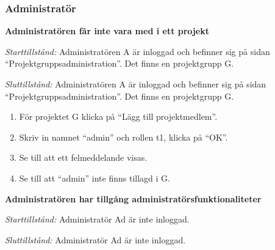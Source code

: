 \documentclass[a4paper]{article}
\begin{document}
\subsubsection{Administratör}
\begin{FT}
\item \textbf{Administratören får inte vara med i ett projekt}

\emph{Starttillstånd:} Administratören A är inloggad och befinner sig på sidan ``Projektgruppsadministration''. Det finns en projektgrupp G.

\emph{Sluttillstånd:} Administratören A är inloggad och befinner sig på sidan ``Projektgruppsadministration''. Det finns en projektgrupp G.

\begin{enumerate}
\item För projektet G klicka på ``Lägg till projektmedlem''.
\item Skriv in namnet ``admin'' och rollen t1, klicka på ``OK''.
\item Se till att ett felmeddelande visas.
\item Se till att ``admin'' inte finns tillagd i G.
\end{enumerate}

\item \textbf{Administratören har tillgång administratörsfunktionaliteter} 

\emph{Starttillstånd:} Administratör Ad är inte inloggad.

\emph{Sluttillstånd:} Administratör Ad är inte inloggad.

\begin{enumerate}


\end{enumerate}
\end{FT}
\end{document}
